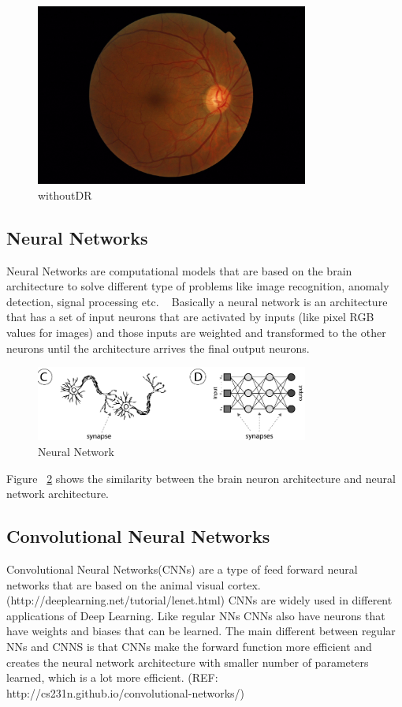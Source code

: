 \begin{figure}[t]
\caption{withoutDR}
\label{fignoDR}
\centering
\includegraphics[width=0.8\textwidth]{Figures/NODR}
\end{figure}

\subsection{Neural Networks}
Neural Networks are computational models that are based on the brain architecture to solve different type of problems like image recognition, anomaly detection, signal processing etc. ~\cite{shiffman2012nature} Basically a neural network is an architecture that has a set of input neurons that are activated by inputs (like pixel RGB values for images) and those inputs are weighted and transformed to the other neurons until the architecture arrives the final output neurons. 

\begin{figure}[t]
\caption{Neural Network}
\label{fignn}
\centering
\includegraphics[width=0.8\textwidth]{Figures/nn}
\end{figure}

Figure ~\ref{fignn} shows the similarity between the brain neuron architecture and neural network architecture. 

\subsection{Convolutional Neural Networks}
Convolutional Neural Networks(CNNs) are a type of feed forward neural networks that are based on the animal visual cortex. (http://deeplearning.net/tutorial/lenet.html) CNNs are widely used in different applications of Deep Learning. 
Like regular NNs CNNs also have neurons that have weights and biases that can be learned. The main different between regular NNs and CNNS is that CNNs make the forward function more efficient and creates the neural network architecture with smaller number of parameters learned, which is a lot more efficient. (REF: http://cs231n.github.io/convolutional-networks/) 

